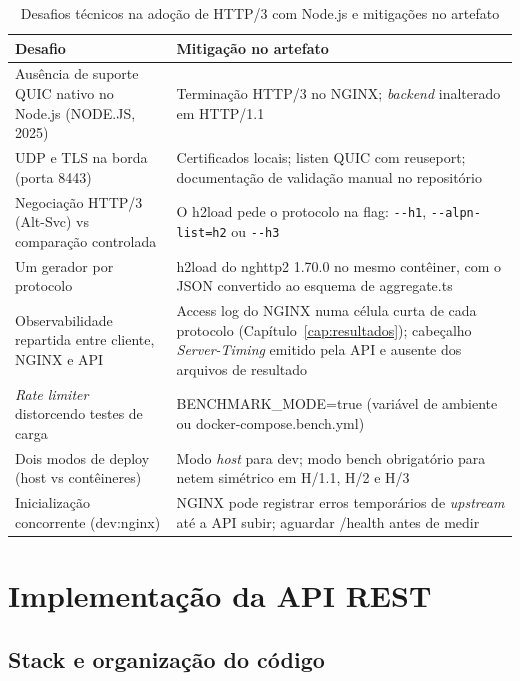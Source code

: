 \begin{table}[htbp]
\centering
\caption{Desafios técnicos na adoção de HTTP/3 com Node.js e mitigações no artefato}\label{tab:desafios-tecnicos}
\small
\setlength{\tabcolsep}{3pt}
\begin{tabular}{@{}>{\raggedright\arraybackslash}p{52mm}>{\raggedright\arraybackslash}p{94mm}@{}}
\hline
\textbf{Desafio} & \textbf{Mitigação no artefato} \\
\hline
Ausência de suporte QUIC nativo no Node.js (NODE.JS, 2025) & Terminação HTTP/3 no NGINX; \textit{backend} inalterado em HTTP/1.1 \\
UDP e TLS na borda (porta 8443) & Certificados locais; listen QUIC com reuseport; documentação de validação manual no repositório \\
Negociação HTTP/3 (Alt-Svc) vs comparação controlada & O h2load pede o protocolo na flag: \texttt{-{}-h1}, \texttt{-{}-alpn-list=h2} ou \texttt{-{}-h3} \\
Um gerador por protocolo & h2load do nghttp2 1.70.0 no mesmo contêiner, com o JSON convertido ao esquema de aggregate.ts \\
Observabilidade repartida entre cliente, NGINX e API & Access log do NGINX numa célula curta de cada protocolo (Capítulo~\ref{cap:resultados}); cabeçalho \textit{Server-Timing} emitido pela API e ausente dos arquivos de resultado \\
\textit{Rate limiter} distorcendo testes de carga & BENCHMARK\_MODE=true (variável de ambiente ou docker-compose.bench.yml) \\
Dois modos de deploy (host vs contêineres) & Modo \textit{host} para dev; modo bench obrigatório para netem simétrico em H/1.1, H/2 e H/3 \\
Inicialização concorrente (dev:nginx) & NGINX pode registrar erros temporários de \textit{upstream} até a API subir; aguardar /health antes de medir \\
\hline
\end{tabular}
\end{table}

\section{Implementação da API REST}

\subsection{Stack e organização do código}

